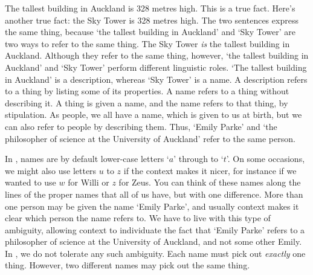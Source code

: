 \documentclass[PHIL101-Textbook.tex]{subfiles}
\begin{document}
The tallest building in Auckland is 328 metres high.
This is a true fact.
Here's another true fact: the Sky Tower is 328 metres high.
The two sentences express the same thing, because `the tallest building in Auckland' and  `Sky Tower' are two ways to refer to the same thing.
The Sky Tower \emph{is} the tallest building in Auckland.
Although they refer to the same thing, however, `the tallest building in Auckland' and `Sky Tower' perform different linguistic roles.
`The tallest building in Auckland' is a description, whereas `Sky Tower' is a name.
A description refers to a thing by listing some of its properties. 
A name refers to a thing without describing it.
A thing is given a name, and the name refers to that thing, by stipulation.
As people, we all have a name, which is given to us at birth, but we can also refer to people by describing them.
Thus, `Emily Parke' and `the philosopher of science at the University of Auckland' refer to the same person.


In \pl, names are by default lower-case letters `$a$' through to `$t$'. On some occasions, we might also use letters $u$ to $z$ if the context makes it nicer, for instance if we wanted to use $w$ for Willi or $z$ for Zeus. 
You can think of these names along the lines of the proper names that all of us have, but with one difference.
More than one person may be given the name `Emily Parke', and usually context makes it clear which person the name refers to.
We have to live with this type of ambiguity, allowing context to individuate the fact that `Emily Parke' refers to a philosopher of science at the University of Auckland, and not some other Emily.
In \pl, we do not tolerate any such ambiguity.
Each name must pick out \emph{exactly} one thing.
However, two different names may pick out the same thing.
\end{document}
